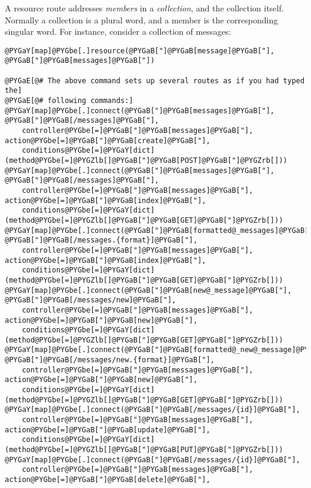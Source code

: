 \documentclass[letterpaper,10pt,english]{manual}
\begin{document}
A resource route addresses \emph{members} in a \emph{collection}, and the collection
itself.  Normally a collection is a plural word, and a member is the
corresponding singular word.  For instance, consider a collection of messages:

\begin{Verbatim}[commandchars=@\[\]]
@PYGaY[map]@PYGbe[.]resource(@PYGaB["]@PYGaB[message]@PYGaB["], @PYGaB["]@PYGaB[messages]@PYGaB["])

@PYGaE[@# The above command sets up several routes as if you had typed the]
@PYGaE[@# following commands:]
@PYGaY[map]@PYGbe[.]connect(@PYGaB["]@PYGaB[messages]@PYGaB["], @PYGaB["]@PYGaB[/messages]@PYGaB["],
    controller@PYGbe[=]@PYGaB["]@PYGaB[messages]@PYGaB["], action@PYGbe[=]@PYGaB["]@PYGaB[create]@PYGaB["],
    conditions@PYGbe[=]@PYGaY[dict](method@PYGbe[=]@PYGZlb[]@PYGaB["]@PYGaB[POST]@PYGaB["]@PYGZrb[]))
@PYGaY[map]@PYGbe[.]connect(@PYGaB["]@PYGaB[messages]@PYGaB["], @PYGaB["]@PYGaB[/messages]@PYGaB["],
    controller@PYGbe[=]@PYGaB["]@PYGaB[messages]@PYGaB["], action@PYGbe[=]@PYGaB["]@PYGaB[index]@PYGaB["],
    conditions@PYGbe[=]@PYGaY[dict](method@PYGbe[=]@PYGZlb[]@PYGaB["]@PYGaB[GET]@PYGaB["]@PYGZrb[]))
@PYGaY[map]@PYGbe[.]connect(@PYGaB["]@PYGaB[formatted@_messages]@PYGaB["], @PYGaB["]@PYGaB[/messages.{format}]@PYGaB["],
    controller@PYGbe[=]@PYGaB["]@PYGaB[messages]@PYGaB["], action@PYGbe[=]@PYGaB["]@PYGaB[index]@PYGaB["],
    conditions@PYGbe[=]@PYGaY[dict](method@PYGbe[=]@PYGZlb[]@PYGaB["]@PYGaB[GET]@PYGaB["]@PYGZrb[]))
@PYGaY[map]@PYGbe[.]connect(@PYGaB["]@PYGaB[new@_message]@PYGaB["], @PYGaB["]@PYGaB[/messages/new]@PYGaB["],
    controller@PYGbe[=]@PYGaB["]@PYGaB[messages]@PYGaB["], action@PYGbe[=]@PYGaB["]@PYGaB[new]@PYGaB["],
    conditions@PYGbe[=]@PYGaY[dict](method@PYGbe[=]@PYGZlb[]@PYGaB["]@PYGaB[GET]@PYGaB["]@PYGZrb[]))
@PYGaY[map]@PYGbe[.]connect(@PYGaB["]@PYGaB[formatted@_new@_message]@PYGaB["], @PYGaB["]@PYGaB[/messages/new.{format}]@PYGaB["],
    controller@PYGbe[=]@PYGaB["]@PYGaB[messages]@PYGaB["], action@PYGbe[=]@PYGaB["]@PYGaB[new]@PYGaB["],
    conditions@PYGbe[=]@PYGaY[dict](method@PYGbe[=]@PYGZlb[]@PYGaB["]@PYGaB[GET]@PYGaB["]@PYGZrb[]))
@PYGaY[map]@PYGbe[.]connect(@PYGaB["]@PYGaB[/messages/{id}]@PYGaB["],
    controller@PYGbe[=]@PYGaB["]@PYGaB[messages]@PYGaB["], action@PYGbe[=]@PYGaB["]@PYGaB[update]@PYGaB["],
    conditions@PYGbe[=]@PYGaY[dict](method@PYGbe[=]@PYGZlb[]@PYGaB["]@PYGaB[PUT]@PYGaB["]@PYGZrb[]))
@PYGaY[map]@PYGbe[.]connect(@PYGaB["]@PYGaB[/messages/{id}]@PYGaB["],
    controller@PYGbe[=]@PYGaB["]@PYGaB[messages]@PYGaB["], action@PYGbe[=]@PYGaB["]@PYGaB[delete]@PYGaB["],

\end{Verbatim}
\end{document}
